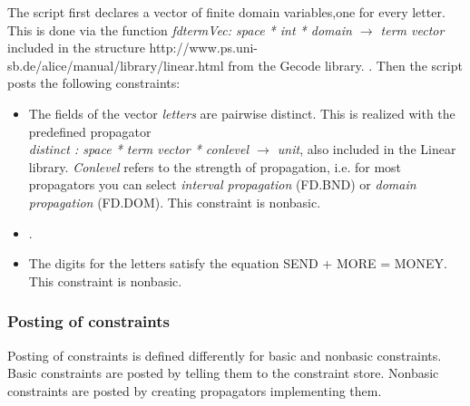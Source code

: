 \documentclass[a4paper,halfparskip]{scrartcl}
\begin{document}
The script first declares a vector of finite domain variables,one for every letter. 
This is done via
the function \emph{fdtermVec: space * int * domain $ \rightarrow $ term vector}
included in the structure
\htmladdnormallink{\textcolor{blue}{Linear}}
{http://www.ps.uni-sb.de/alice/manual/library/linear.html} from the Gecode 
library. . 
Then the script posts the
following constraints:
\begin{itemize}
\item
The fields of the vector \emph{letters} are pairwise 
distinct. This is
realized with the predefined propagator \\
\emph{distinct : space * term vector * conlevel $ \rightarrow $ 
unit}, also included
in the Linear library. \emph{Conlevel} refers to 
the strength of
propagation, i.e. for most propagators you can select 
\emph{interval propagation} (FD.BND)
or \emph{domain propagation} (FD.DOM). 
This constraint 
is nonbasic.
\item
{}.
\item
The digits for the letters satisfy the equation
SEND + MORE = MONEY. This constraint is nonbasic.
\end{itemize}

\subsubsection{Posting of constraints}
Posting of constraints is defined differently for basic and 
nonbasic constraints. Basic constraints are posted by telling 
them to the constraint store. Nonbasic constraints are posted 
by creating propagators implementing them.
\end{document}
